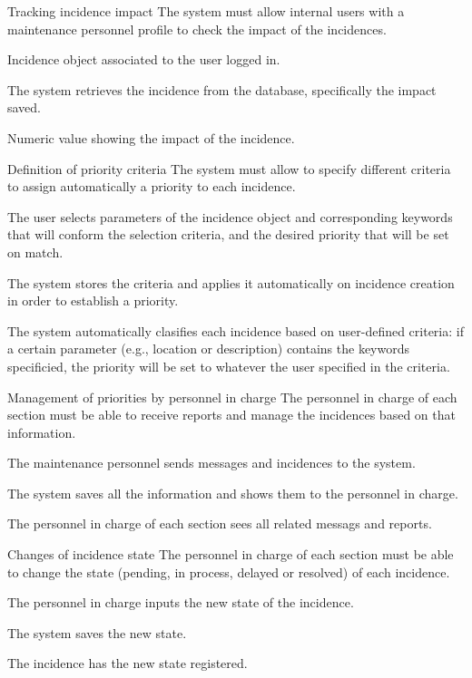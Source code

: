 
\begin{requirement}{Tracking incidence impact}
\reqdesc The system must allow internal users with a maintenance personnel profile to check the impact of the incidences.

\reqin Incidence object associated to the user logged in.

\reqsteps The system retrieves the incidence from the database, specifically the impact saved.

\reqout Numeric value showing the impact of the incidence.
\end{requirement}


\begin{requirement}{Definition of priority criteria}
\reqdesc The system must allow to specify different criteria to assign automatically a priority to each incidence.

\reqin The user selects parameters of the incidence object and corresponding keywords that will conform the selection criteria, and the desired priority that will be set on match.

\reqsteps The system stores the criteria and applies it automatically on incidence creation in order to establish a priority.

\reqout The system automatically clasifies each incidence based on user-defined criteria: if a certain parameter (e.g., location or description) contains the keywords specificied, the priority will be set to whatever the user specified in the criteria.
\end{requirement}


\begin{requirement}{Management of priorities by personnel in charge}
\reqdesc The personnel in charge of each section must be able to receive reports and manage the incidences based on that information.

\reqin The maintenance personnel sends messages and incidences to the system.

\reqsteps The system saves all the information and shows them to the personnel in charge.

\reqout The personnel in charge of each section sees all related messags and reports.
\end{requirement}


\begin{requirement}{Changes of incidence state}
\reqdesc The personnel in charge of each section must be able to change the state (pending, in process, delayed or resolved) of each incidence.

\reqin The personnel in charge inputs the new state of the incidence.

\reqsteps The system saves the new state.

\reqout The incidence has the new state registered.
\end{requirement}

